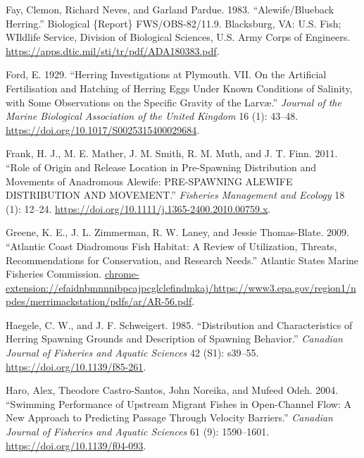 \documentclass[
]{book}
\newlength{\cslhangindent}
\newlength{\cslentryspacingunit} %
\newenvironment{CSLReferences}[2] %
 {%
  \setlength{\parindent}{0pt}
  \ifodd #1
  \let\oldpar\par
  \def\par{\hangindent=\cslhangindent\oldpar}
  \fi
  \setlength{\parskip}{#2\cslentryspacingunit}
 }%
 {}
\begin{document}
\begin{CSLReferences}{1}{0}
\leavevmode{}%
Fay, Clemon, Richard Neves, and Garland Pardue. 1983. {``Alewife/{Blueback} {Herring}.''} Biological \{Report\} FWS/OBS-82/11.9. Blacksburg, VA: U.S. Fish; WIldlife Service, Division of Biological Sciences, U.S. Army Corps of Engineers. \url{https://apps.dtic.mil/sti/tr/pdf/ADA180383.pdf}.

\leavevmode{}%
Ford, E. 1929. {``Herring {Investigations} at {Plymouth}. {VII}. {On} the {Artificial} {Fertilisation} and {Hatching} of {Herring} {Eggs} Under Known {Conditions} of {Salinity}, with Some {Observations} on the {Specific} {Gravity} of the {Larvæ}.''} \emph{Journal of the Marine Biological Association of the United Kingdom} 16 (1): 43--48. \url{https://doi.org/10.1017/S0025315400029684}.

\leavevmode{}%
Frank, H. J., M. E. Mather, J. M. Smith, R. M. Muth, and J. T. Finn. 2011. {``Role of Origin and Release Location in Pre-Spawning Distribution and Movements of Anadromous Alewife: {PRE}-{SPAWNING} {ALEWIFE} {DISTRIBUTION} {AND} {MOVEMENT}.''} \emph{Fisheries Management and Ecology} 18 (1): 12--24. \url{https://doi.org/10.1111/j.1365-2400.2010.00759.x}.

\leavevmode{}%
Greene, K. E., J. L. Zimmerman, R. W. Laney, and Jessie Thomas-Blate. 2009. {``Atlantic {Coast} {Diadromous} {Fish} {Habitat}: {A} {Review} of {Utilization}, {Threats}, {Recommendations} for {Conservation}, and {Research} {Needs}.''} Atlantic States Marine Fisheries Commission. \url{chrome-extension://efaidnbmnnnibpcajpcglclefindmkaj/https://www3.epa.gov/region1/npdes/merrimackstation/pdfs/ar/AR-56.pdf}.

\leavevmode{}%
Haegele, C. W., and J. F. Schweigert. 1985. {``Distribution and {Characteristics} of {Herring} {Spawning} {Grounds} and {Description} of {Spawning} {Behavior}.''} \emph{Canadian Journal of Fisheries and Aquatic Sciences} 42 (S1): s39--55. \url{https://doi.org/10.1139/f85-261}.

\leavevmode{}%
Haro, Alex, Theodore Castro-Santos, John Noreika, and Mufeed Odeh. 2004. {``Swimming Performance of Upstream Migrant Fishes in Open-Channel Flow: A New Approach to Predicting Passage Through Velocity Barriers.''} \emph{Canadian Journal of Fisheries and Aquatic Sciences} 61 (9): 1590--1601. \url{https://doi.org/10.1139/f04-093}.


\end{CSLReferences}
\end{document}
